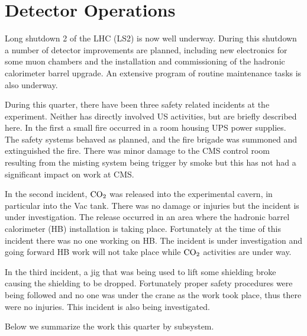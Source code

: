 \documentclass[12pt]{article}
\begin{document}
\section{Detector Operations}

Long shutdown 2 of the LHC (LS2) is now well underway.  During this shutdown a
number of detector improvements are planned, including new electronics for some
muon chambers and the installation and commissioning of the hadronic calorimeter
barrel upgrade. An extensive program of routine maintenance tasks is also underway.

During this quarter, there have been three safety related incidents at the experiment.  Neither has directly involved US activities, but are briefly described here.   In the first a small fire occurred in a room housing UPS power supplies.  The safety systems behaved as planned, and the fire brigade was summoned and extinguished the fire.  There was minor damage to the CMS control room resulting from the misting system being trigger by smoke but this has not had a significant impact on work at CMS.  

In the second incident, $\rm CO_2$ was released into the experimental cavern, in 
particular into the Vac tank.  There was no damage or injuries but the incident is
under investigation.  The release occurred in an area where the hadronic barrel
calorimeter (HB) installation is taking place. Fortunately at the time of this
incident there was no one working on HB.  The incident is under investigation and
going forward HB work will not take place while $\rm CO_2$ activities are under
way.

In the third incident, a jig that was being used to lift some shielding broke
causing the shielding to be dropped.
Fortunately proper safety procedures were being followed and no one was under the
crane as the work took place, thus there were no injuries.  This incident is also
being investigated.


Below we summarize the work this quarter by subsystem.
\end{document}
